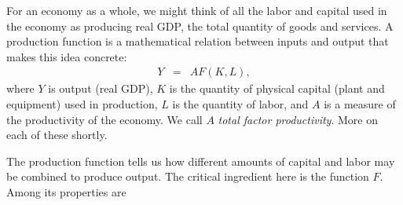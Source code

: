 For an economy as a whole, we might think of all the labor and capital
used in the economy as producing real GDP,
the total quantity of goods and services.
A production function is a mathematical relation between inputs and output
that makes this idea concrete:
\begin{eqnarray*}
    Y &=& A F(K,L) ,
    \label{eq:pf-general}
\end{eqnarray*}
where $Y$ is output (real GDP), $K$ is the quantity of physical capital
(plant and equipment) used in production,
$L$ is the quantity of labor,
and $A$ is a measure of the productivity of the economy. We call $A$ \emph{total factor productivity}.
More on each of these shortly.


The production function tells us how different amounts of capital and labor
may be combined to produce output.
The critical ingredient here is the function $F$.
Among its properties are
%
